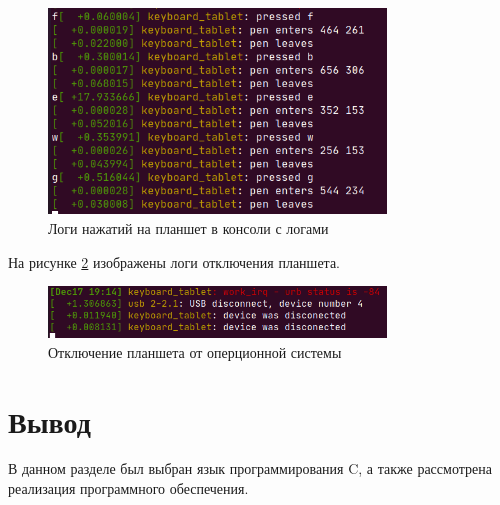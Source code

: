 \begin{figure}[H]
    \centering
    \includegraphics[width=0.8\textwidth]{img/work_wletters.png}
    \caption{Логи нажатий на планшет в консоли с логами}
    \label{fig:work_wletters}
\end{figure}

На рисунке \ref{fig:disconnect} изображены логи отключения планшета.

\begin{figure}[H]
    \centering
    \includegraphics[width=0.8\textwidth]{img/disconnect.png}
    \caption{Отключение планшета от оперционной системы}
    \label{fig:disconnect}
\end{figure}

\section{Вывод}

В данном разделе был выбран язык программирования C, а также рассмотрена реализация программного обеспечения.

